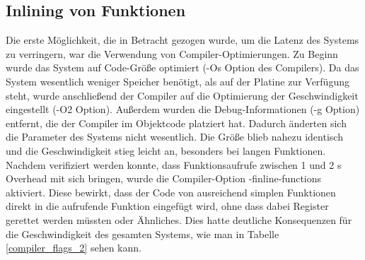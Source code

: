 \subsection{Inlining von Funktionen}
Die erste Möglichkeit, die in Betracht gezogen wurde, um die Latenz des Systems zu verringern, war die Verwendung von
Compiler-Optimierungen. Zu Beginn wurde das System auf Code-Größe optimiert (-Os Option des Compilers). Da das System
wesentlich weniger Speicher benötigt, als auf der Platine zur Verfügung steht, wurde
anschließend der Compiler auf die Optimierung der Geschwindigkeit eingestellt (-O2 Option). Außerdem wurden die Debug-Informationen
(-g Option) entfernt, die der Compiler im Objektcode platziert hat. Dadurch änderten sich die Parameter des Systems nicht
wesentlich. Die Größe blieb nahezu identisch und die Geschwindigkeit stieg leicht an, besonders bei langen Funktionen.\\
Nachdem verifiziert werden konnte, dass Funktionsaufrufe zwischen 1 und 2 \textmu{}s Overhead mit sich bringen, wurde
die Compiler-Option -finline-functions aktiviert. Diese bewirkt, dass der Code von ausreichend simplen Funktionen direkt in die aufrufende
Funktion eingefügt wird, ohne dass dabei Register gerettet werden müssten oder Ähnliches. Dies hatte deutliche
Konsequenzen für die Geschwindigkeit des gesamten Systems, wie man in Tabelle \ref{compiler_flags_2} sehen kann.
